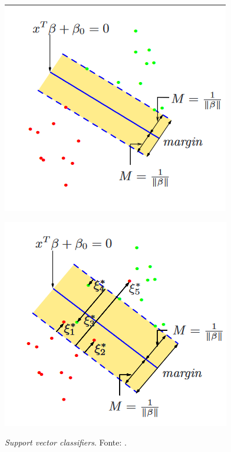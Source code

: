 \begin{apendicesenv}
\begin{figure}
  \begin{minipage}[t]{\linewidth}
    {
      \centering
      \raisebox{-\height}
      {\includegraphics{img/svm1.png}}
    }
  \end{minipage}%
  \newline
  \begin{minipage}[t]{\linewidth}
    {
      \centering
      \raisebox{-\height}
      {\includegraphics{img/svm2.png}}
    }
  \end{minipage}%
  \caption[\emph{Support vector classifiers}]{\label{fig-svm}\emph{Support vector classifiers}. Fonte: \textcite{hastie_elements_2009}.}
\end{figure}


\end{apendicesenv}
